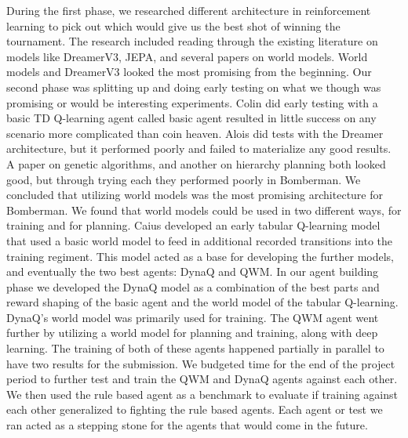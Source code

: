 \documentclass[article, 10pt]{IEEEtran}
\begin{document}
During the first phase, we researched different architecture in reinforcement learning to pick out which would give us the best shot of winning the tournament. The research included reading through the existing literature on models like DreamerV3\cite{hafner2023dreamerv3}, JEPA\cite{assran2023ijepa}, and several papers on world models\cite{dong2026qwm}\cite{ha2018worldmodels}\cite{schrittwieser2020mastering}. World models and DreamerV3 looked the most promising from the beginning. Our second phase was splitting up and doing early testing on what we though was promising or would be interesting experiments. Colin did early testing with a basic TD Q-learning agent called basic agent resulted in little success on any scenario more complicated than coin heaven. Alois did tests with the Dreamer architecture, but it performed poorly and failed to materialize any good results. A paper on genetic algorithms, and another on hierarchy planning both looked good, but through trying each they performed poorly in Bomberman. We concluded that utilizing world models was the most promising architecture for Bomberman. We found that world models could be used in two different ways, for training and for planning. Caius developed an early tabular Q-learning model that used a basic world model to feed in additional recorded transitions into the training regiment. This model acted as a base for developing the further models, and eventually the two best agents: DynaQ and QWM. In our agent building phase we developed the DynaQ model as a combination of the best parts and reward shaping of the basic agent and the world model of the tabular Q-learning. DynaQ's world model was primarily used for training. The QWM agent went further by utilizing a world model for planning and training, along with deep learning. The training of both of these agents happened partially in parallel to have two results for the submission. We budgeted time for the end of the project period to further test and train the QWM and DynaQ agents against each other. We then used the rule based agent as a benchmark to evaluate if training against each other generalized to fighting the rule based agents. Each agent or test we ran acted as a stepping stone for the agents that would come in the future.
\end{document}
